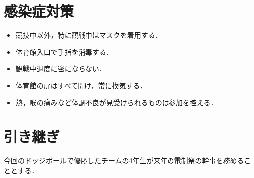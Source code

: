\documentclass[dvipdfmx]{jsarticle}
\begin{document}
\section{感染症対策}
\begin{itemize}
  \item 競技中以外，特に観戦中はマスクを着用する．
  \item 体育館入口で手指を消毒する．
  \item 観戦中過度に密にならない．
  \item 体育館の扉はすべて開け，常に換気する．
  \item 熱，喉の痛みなど体調不良が見受けられるものは参加を控える．
\end{itemize}

\section{引き継ぎ}
今回のドッジボールで優勝したチームの4年生が来年の電制祭の幹事を務めることとする．
\end{document}
